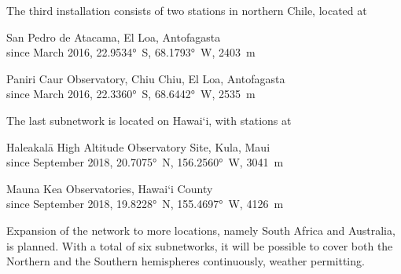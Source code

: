         The third installation consists of two stations in northern Chile, located at
        \begin{description}[leftmargin = 25mm]
            \item[SP]       San Pedro de Atacama, El Loa, Antofagasta \\
                            since March 2016, \ang{22.9534}~S, \ang{68.1793}~W, \SI{2403}{\metre}
            \item[PC]       Paniri Caur Observatory, Chiu Chiu, El Loa, Antofagasta \\
                            since March 2016, \ang{22.3360}~S, \ang{68.6442}~W, \SI{2535}{\metre}
        \end{description}

        The last subnetwork is located on Hawai`i, with stations at
        \begin{description}[leftmargin = 25mm]
            \item[HK]       Haleakalā High Altitude Observatory Site, Kula, Maui \\
                            since September 2018, \ang{20.7075}~N, \ang{156.2560}~W, \SI{3041}{\metre}
            \item[MK]       Mauna Kea Observatories, Hawai`i County \\
                            since September 2018, \ang{19.8228}~N, \ang{155.4697}~W, \SI{4126}{\metre}
        \end{description}


        Expansion of the network to more locations, namely South Africa and Australia, is planned.
        With a total of six subnetworks, it will be possible to cover both the Northern and
        the Southern hemispheres continuously, weather permitting.
